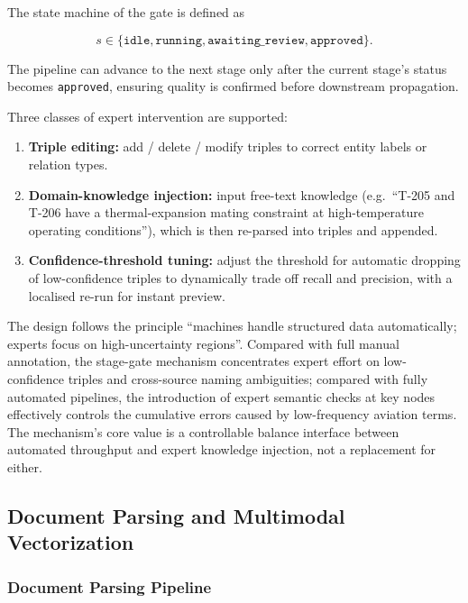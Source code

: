\documentclass[applsci,article,submit,pdftex,moreauthors]{Definitions/mdpi}
\begin{document}
The state machine of the gate is defined as
\begin{linenomath}
\begin{equation}
s\in\{\texttt{idle}, \texttt{running}, \texttt{awaiting\_review}, \texttt{approved}\}.
\label{eq:hitl-state}
\end{equation}
\end{linenomath}
The pipeline can advance to the next stage only after the current stage's status becomes \texttt{approved}, ensuring quality is confirmed before downstream propagation.

Three classes of expert intervention are supported:
\begin{enumerate}
\item \textbf{Triple editing:} add / delete / modify triples to correct entity labels or relation types.
\item \textbf{Domain-knowledge injection:} input free-text knowledge (e.g.\ ``T-205 and T-206 have a thermal-expansion mating constraint at high-temperature operating conditions''), which is then re-parsed into triples and appended.
\item \textbf{Confidence-threshold tuning:} adjust the threshold for automatic dropping of low-confidence triples to dynamically trade off recall and precision, with a localised re-run for instant preview.
\end{enumerate}

The design follows the principle ``machines handle structured data automatically; experts focus on high-uncertainty regions''. Compared with full manual annotation, the stage-gate mechanism concentrates expert effort on low-confidence triples and cross-source naming ambiguities; compared with fully automated pipelines, the introduction of expert semantic checks at key nodes effectively controls the cumulative errors caused by low-frequency aviation terms. The mechanism's core value is a controllable balance interface between automated throughput and expert knowledge injection, not a replacement for either.

\subsection{Document Parsing and Multimodal Vectorization}
\label{sec:index}

\subsubsection{Document Parsing Pipeline}
\label{sec:parse}
\end{document}
